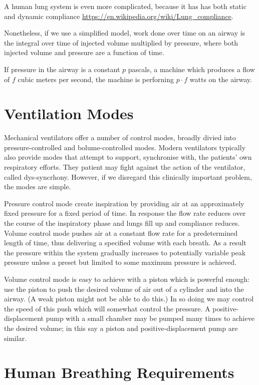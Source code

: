 \documentclass[conference]{article}
\begin{document}
A human lung system is even more
complicated, because it has has
both static and dynamic compliance \url{https://en.wikipedia.org/wiki/Lung_compliance}.

Nonetheless, if we use a simplified model, work done over time
on an airway is the integral over time of injected volume
multiplied by pressure, where both injected volume and
pressure are a function of time.

If pressure in the airway is a constant $p$ pascals, a machine which produces a flow of $f$ cubic meters
per second, the machine is perforning $p \cdot f$ watts on the airway.


\section{Ventilation Modes}

Mechanical ventilators offer a number of control modes,
broadly divied into pressure-controlled and bolume-controlled modes.
Modern ventilators typically also provide modes that attempt to support, synchronise with, the patients' own respiratory efforts.
They patient may fight against the action of the ventilator,
called dys-syncrhony. However, if we disregard this clinically
important problem, the modes are simple.

Pressure control mode create inspiration by providing air
at an approximately fixed pressure for a fixed period of time.
In response the flow rate reduces over the course of the inspiratory
phase and lungs fill up and compliance reduces.
Volume control mode pushes air at a constant flow rate for a predetermined length
of time, thus delivering a specified volume with each breath.
As a result the pressure within the system gradually increases to potentially
variable peak pressure unless a preset but limited to some maximum pressure is achieved.


Volume control mode is easy to achieve with a piston which is
powerful enough: use the piston to push the desired volume of
air out of a cylinder and into the airway. (A weak piston might
not be able to do this.) In so doing we may control the speed
of this push which will somewhat control the pressure.
A positive-displacement pump with a small chamber may be pumped
many times to achieve the desired volume; in this say a
piston and positive-displacement pump are similar.

\section{Human Breathing Requirements}
\end{document}
